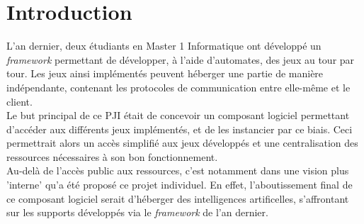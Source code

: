 \chapter{Introduction}

	L'an dernier, deux étudiants en Master 1 Informatique ont développé un \textit{framework} permettant de développer, à l'aide d'automates, des jeux au tour par tour. Les jeux ainsi implémentés peuvent héberger une partie de manière indépendante, contenant les protocoles de communication entre elle-même et le client.
	\\
	
	Le but principal de ce PJI était de concevoir un composant logiciel permettant d'accéder aux différents jeux implémentés, et de les instancier par ce biais. Ceci permettrait alors un accès simplifié aux jeux développés et une centralisation des ressources nécessaires à son bon fonctionnement.
	\\
	
	Au-delà de l'accès public aux ressources, c'est notamment dans une vision plus 'interne' qu'a été proposé ce projet individuel. En effet, l'aboutissement final de ce composant logiciel serait d'héberger des intelligences artificelles, s'affrontant sur les supports développés via le \textit{framework} de l'an dernier.
	\\